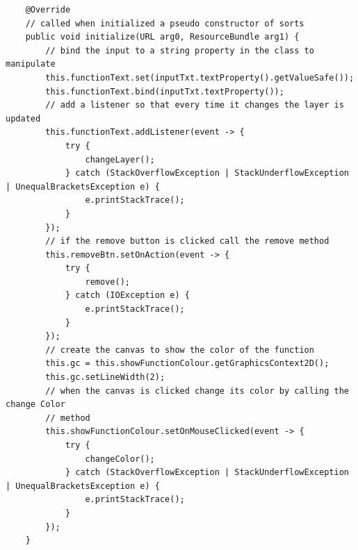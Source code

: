 \documentclass[../../../../main.tex]{subfiles}
\begin{document}
\begin{verbatim}
	@Override
	// called when initialized a pseudo constructor of sorts
	public void initialize(URL arg0, ResourceBundle arg1) {
		// bind the input to a string property in the class to manipulate
		this.functionText.set(inputTxt.textProperty().getValueSafe());
		this.functionText.bind(inputTxt.textProperty());
		// add a listener so that every time it changes the layer is updated
		this.functionText.addListener(event -> {
			try {
				changeLayer();
			} catch (StackOverflowException | StackUnderflowException | UnequalBracketsException e) {
				e.printStackTrace();
			}
		});
		// if the remove button is clicked call the remove method
		this.removeBtn.setOnAction(event -> {
			try {
				remove();
			} catch (IOException e) {
				e.printStackTrace();
			}
		});
		// create the canvas to show the color of the function
		this.gc = this.showFunctionColour.getGraphicsContext2D();
		this.gc.setLineWidth(2);
		// when the canvas is clicked change its color by calling the change Color
		// method
		this.showFunctionColour.setOnMouseClicked(event -> {
			try {
				changeColor();
			} catch (StackOverflowException | StackUnderflowException | UnequalBracketsException e) {
				e.printStackTrace();
			}
		});
	}


\end{verbatim}
\end{document}
